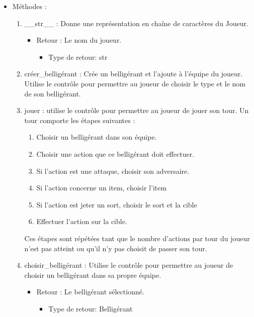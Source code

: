 \documentclass[12pt,pdftex,oneside]{article}
\begin{document}
\begin{itemize}
\begin{enumerate}
  \end{enumerate}

  \item Méthodes : 

    \begin{enumerate}
    \item \_\_str\_\_ : Donne une représentation en chaîne de caractères du Joueur.
      \begin{itemize}
      \item Retour : Le nom du joueur.
          \begin{itemize}
          \item Type de retour: str
          \end{itemize}
      \end{itemize}

    \item créer\_belligérant : Crée un belligérant et l'ajoute à l'équipe du
      joueur. Utilise le contrôle pour permettre au joueur de choisir le type et
      le nom de son belligérant.

    \item jouer : utilise le contrôle pour permettre au joueur de jouer son
      tour. Un tour comporte les étapes suivantes :
      \begin{enumerate}
        \item Choisir un belligérant dans son équipe.
        \item Choisir une action que ce belligérant doit effectuer.
        \item Si l'action est une attaque, choisir son adversaire.
        \item Si l'action concerne un item, choisir l'item
        \item Si l'action est jeter un sort, choisir le sort et la cible
        \item Effectuer l'action sur la cible.
      \end{enumerate}
      Ces étapes sont répétées tant que le nombre d'actions par tour du joueur
      n'est pas atteint ou qu'il n'y pas choisit de passer son tour.

    \item choisir\_belligérant : Utilise le contrôle pour permettre au joueur de
      choisir un belligérant dans sa propre équipe.
      \begin{itemize}
      \item Retour : Le belligérant sélectionné.
          \begin{itemize}
          \item Type de retour: Belligérant
          \end{itemize}
      \end{itemize}


\end{enumerate}
\end{itemize}
\end{document}
